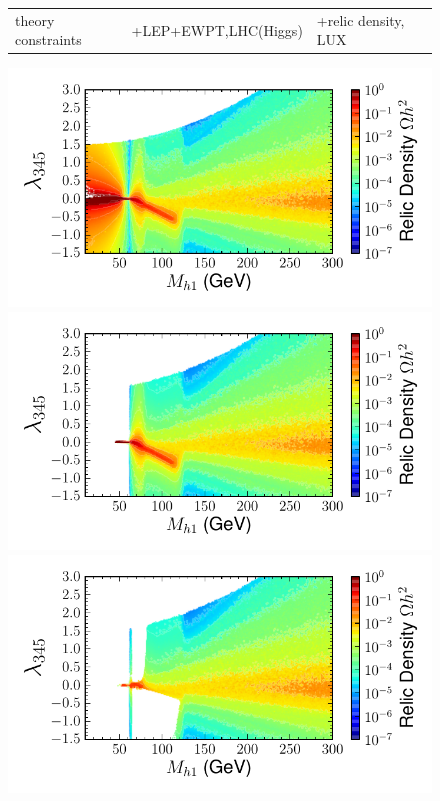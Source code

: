 \documentclass[12pt,a4paper]{article}
\begin{document}
\begin{figure}[tbh]
\begin{center}
\begin{tabular}{p{} p{} p{}}
\hspace*{1cm}theory constraints &+LEP+EWPT,LHC(Higgs) &\hspace*{-1cm}+relic density, LUX
\end{tabular}
\includegraphics[trim={0.5cm   0     2.4cm     0.3cm},clip,height=0.2\textheight]{Mh1_ld345_Omega_small_new-cut12_z.pdf}%
\includegraphics[trim={1.3cm 0   2.4cm   0.3cm},  clip,height=0.2\textheight]{Mh1_ld345_Omega_small_new-cut123456_z.pdf}%
\includegraphics[trim={1.3cm 0   0      0.3cm },  clip,height=0.2\textheight]{Mh1_ld345_Omega_small_new-cut12345678_z.pdf}

\end{center}
\end{figure}
\end{document}
